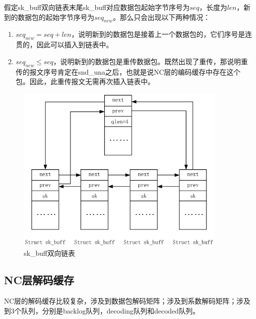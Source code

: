 \par
假定sk\_buff双向链表末尾sk\_buff对应数据包起始字节序号为$seq$，长度为$len$，新到的数据包的起始字节序号为$seq_{new}$。那么只会出现以下两种情况：
\begin{enumerate}[fullwidth,itemindent=2em,label=(\arabic*)]
	\item $seq_{new}=seq+len$，说明新到的数据包是接着上一个数据包的，它们序号是连贯的，因此可以插入到链表中。
	\item $seq_{new} \le seq$，说明新到的数据包是重传数据包。既然出现了重传，那说明重传的报文序号肯定在snd\_una之后，也就是说NC层的编码缓存中存在这个包。因此，此重传报文无需再次插入链表中。
\end{enumerate}
\begin{figure}[htbp]
	\centering
	\includegraphics[width=4in]{figures/skbufflink.eps}
	\caption{sk\_buff双向链表}
	\label{SKBUFFLINK_EPS}
\end{figure}
\subsection{NC层解码缓存}
NC层的解码缓存比较复杂，涉及到数据包解码矩阵；涉及到系数解码矩阵；涉及到3个队列，分别是backlog队列，decoding队列和decoded队列。
